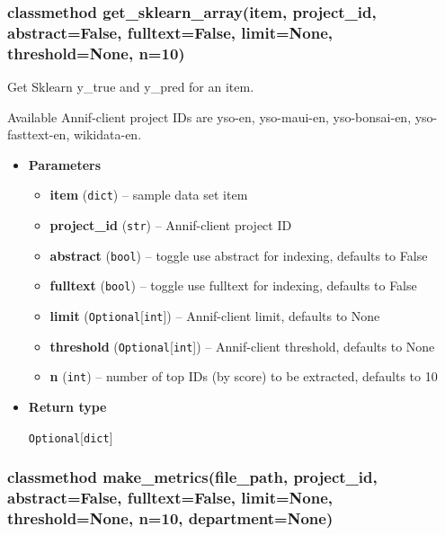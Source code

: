 \hypertarget{classmethod-get_sklearn_arrayitem-project_id-abstractfalse-fulltextfalse-limitnone-thresholdnone-n10}{%
\subsubsection{classmethod get\_sklearn\_array(item, project\_id,
abstract=False, fulltext=False, limit=None, threshold=None,
n=10)}\label{classmethod-get_sklearn_arrayitem-project_id-abstractfalse-fulltextfalse-limitnone-thresholdnone-n10}}

Get Sklearn y\_true and y\_pred for an item.

Available Annif-client project IDs are yso-en, yso-maui-en,
yso-bonsai-en, yso-fasttext-en, wikidata-en.

\begin{itemize}
\item
  \textbf{Parameters}

  \begin{itemize}
  \item
    \textbf{item} (\texttt{dict}) -- sample data set item
  \item
    \textbf{project\_id} (\texttt{str}) -- Annif-client project ID
  \item
    \textbf{abstract} (\texttt{bool}) -- toggle use abstract for
    indexing, defaults to False
  \item
    \textbf{fulltext} (\texttt{bool}) -- toggle use fulltext for
    indexing, defaults to False
  \item
    \textbf{limit} (\texttt{Optional}{[}\texttt{int}{]}) -- Annif-client
    limit, defaults to None
  \item
    \textbf{threshold} (\texttt{Optional}{[}\texttt{int}{]}) --
    Annif-client threshold, defaults to None
  \item
    \textbf{n} (\texttt{int}) -- number of top IDs (by score) to be
    extracted, defaults to 10
  \end{itemize}
\item
  \textbf{Return type}

  \texttt{Optional}{[}\texttt{dict}{]}
\end{itemize}

\hypertarget{classmethod-make_metricsfile_path-project_id-abstractfalse-fulltextfalse-limitnone-thresholdnone-n10-departmentnone}{%
\subsubsection{classmethod make\_metrics(file\_path, project\_id,
abstract=False, fulltext=False, limit=None, threshold=None, n=10,
department=None)}\label{classmethod-make_metricsfile_path-project_id-abstractfalse-fulltextfalse-limitnone-thresholdnone-n10-departmentnone}}

